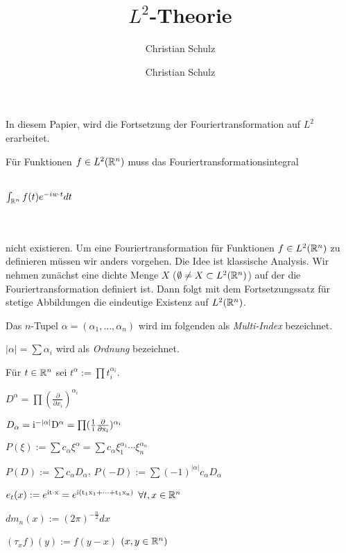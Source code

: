 \documentclass{article}
\author{Christian Schulz}
\title{$L^2$-Theorie}
\author{Christian Schulz}
\def\ie{\rm i}
\begin{document}
\maketitle

In diesem Papier, wird die Fortsetzung der Fouriertransformation auf $L^2$ erarbeitet. 
\begin{motivation}
Für Funktionen $f \in L^2(\mathbb{R}^n)$ muss das Fouriertransformationsintegral \\ \\
\centerline{$\int_{\mathbb{R}^n}f(t) e^{-iw \cdot t} dt$} \\ \\
nicht existieren. Um eine Fouriertransformation für Funktionen $f \in  L^2(\mathbb{R}^n)$ zu definieren müssen wir anders vorgehen.
Die Idee ist klassische Analysis. Wir nehmen zunächst eine dichte Menge $X$ ($\emptyset \neq X \subset L^2(\mathbb{R}^n)$) auf der die
Fouriertransformation definiert ist. Dann folgt mit dem Fortsetzungssatz für stetige Abbildungen die eindeutige Existenz auf $L^2(\mathbb{R}^n)$. \\
\end{motivation}

\begin{definition}
\begin{liste}
\item Das $n$-Tupel $\alpha = (\alpha_1, \dots, \alpha_n)$ wird im folgenden als \emph{Multi-Index} bezeichnet.
\item $|\alpha| = \sum \alpha_i$ wird als \emph{Ordnung} bezeichnet.
\item Für $ t \in \mathbb{R}^n$ sei $t^{\alpha} := \prod t_i^{\alpha_i}$.
\item $D^{\alpha} = \prod (\frac{\partial}{\partial x_i})^{\alpha_i}$
\item $D_{\alpha} = \ie^{-|\alpha|}D^{\alpha} =\prod (\frac{1}{i} \frac{\partial}{\partial x_i})^{\alpha_i}$
\item $P(\xi) := \sum c_{\alpha} \xi^{\alpha} = \sum c_{\alpha} \xi_1^{\alpha_1} \cdots \xi_n^{\alpha_n}$
\item $P(D) := \sum c_{\alpha} D_{\alpha}$, $P(-D) := \sum (-1)^{|\alpha|} c_{\alpha} D_{\alpha} $
\item $e_t(x) := e^{\ie t \cdot x} = e^{ \ie( t_1x_1 + \cdots + t_1x_n ) }$ $\forall t,x \in \mathbb{R}^n$
\item $dm_n(x) := (2\pi)^{-\frac{n}{2}} dx$
\item $(\tau_x f)(y) := f(y-x)$  $(x,y \in \mathbb{R}^n)$
\end{liste}
\end{definition}
\end{document}
